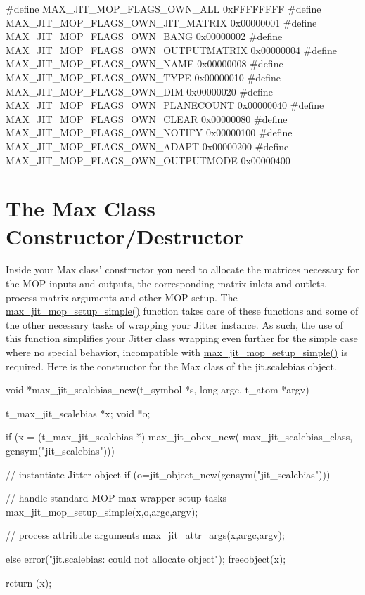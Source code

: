\begin{DoxyCode}
#define MAX_JIT_MOP_FLAGS_OWN_ALL           0xFFFFFFFF
#define MAX_JIT_MOP_FLAGS_OWN_JIT_MATRIX    0x00000001
#define MAX_JIT_MOP_FLAGS_OWN_BANG          0x00000002
#define MAX_JIT_MOP_FLAGS_OWN_OUTPUTMATRIX  0x00000004
#define MAX_JIT_MOP_FLAGS_OWN_NAME          0x00000008
#define MAX_JIT_MOP_FLAGS_OWN_TYPE          0x00000010
#define MAX_JIT_MOP_FLAGS_OWN_DIM           0x00000020
#define MAX_JIT_MOP_FLAGS_OWN_PLANECOUNT    0x00000040
#define MAX_JIT_MOP_FLAGS_OWN_CLEAR         0x00000080
#define MAX_JIT_MOP_FLAGS_OWN_NOTIFY        0x00000100
#define MAX_JIT_MOP_FLAGS_OWN_ADAPT         0x00000200
#define MAX_JIT_MOP_FLAGS_OWN_OUTPUTMODE    0x00000400
\end{DoxyCode}
\hypertarget{chapter_jit_mopqs_chapter_jit_mopqs_maxctordtor}{}\section{The Max Class Constructor/Destructor}\label{chapter_jit_mopqs_chapter_jit_mopqs_maxctordtor}
Inside your Max class' constructor you need to allocate the matrices necessary for the MOP inputs and outputs, the corresponding matrix inlets and outlets, process matrix arguments and other MOP setup. The \hyperlink{group__maxmopmod_gac3eaca207281516b72e81f0dc5f4bf94}{max\_\-jit\_\-mop\_\-setup\_\-simple()} function takes care of these functions and some of the other necessary tasks of wrapping your Jitter instance. As such, the use of this function simplifies your Jitter class wrapping even further for the simple case where no special behavior, incompatible with \hyperlink{group__maxmopmod_gac3eaca207281516b72e81f0dc5f4bf94}{max\_\-jit\_\-mop\_\-setup\_\-simple()} is required. Here is the constructor for the Max class of the jit.scalebias object.


\begin{DoxyCode}
void *max_jit_scalebias_new(t_symbol *s, long argc, t_atom *argv)
{
   t_max_jit_scalebias *x;
   void *o;

   if (x = (t_max_jit_scalebias *)
      max_jit_obex_new(
      max_jit_scalebias_class,
      gensym("jit_scalebias"))) 
   {
      // instantiate Jitter object
      if (o=jit_object_new(gensym("jit_scalebias"))) 
      {
         // handle standard MOP max wrapper setup tasks
         max_jit_mop_setup_simple(x,o,argc,argv);         

         // process attribute arguments
         max_jit_attr_args(x,argc,argv);
      } 
      else 
      {
         error("jit.scalebias: could not allocate object");
         freeobject(x);
      }
   }
   return (x);
}
\end{DoxyCode}


